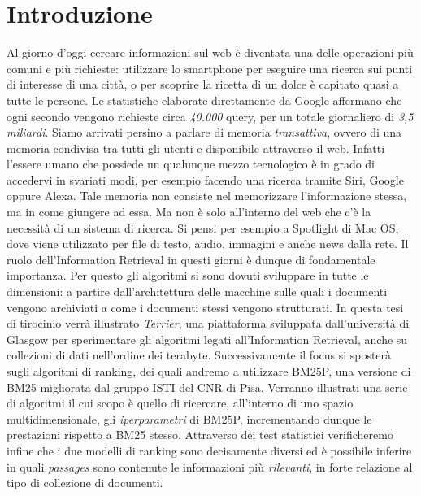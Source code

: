 \chapter{Introduzione}
Al giorno d'oggi cercare informazioni sul web è diventata una delle operazioni più comuni e più richieste:
utilizzare lo smartphone per eseguire una ricerca sui punti di interesse di una città, o per scoprire la ricetta di un dolce è capitato quasi a tutte le persone.
Le statistiche elaborate direttamente da Google affermano che ogni secondo vengono richieste circa \textit{40.000} query, per un totale
giornaliero di \textit{3,5 miliardi}.
Siamo arrivati persino a parlare di memoria \textit{transattiva}, ovvero di una memoria condivisa tra tutti gli utenti e disponibile attraverso il web.
Infatti l'essere umano che possiede un qualunque mezzo tecnologico è in grado di accedervi in svariati modi, per esempio facendo una ricerca tramite Siri, Google oppure Alexa.
Tale memoria non consiste nel memorizzare l'informazione stessa, ma in come giungere ad essa.
Ma non è solo all'interno del web che c'è la necessità di un sistema di ricerca. Si pensi per esempio a Spotlight di Mac OS, dove
viene utilizzato  per file di testo, audio, immagini e anche news dalla rete.
Il ruolo dell'Information Retrieval in questi giorni è dunque di fondamentale importanza.
Per questo gli algoritmi si sono dovuti sviluppare in tutte le dimensioni: a partire dall'architettura delle macchine sulle quali i documenti vengono archiviati a come i documenti stessi vengono strutturati. In questa tesi di tirocinio verrà illustrato \textit{Terrier}, una piattaforma sviluppata dall'università di Glasgow
per sperimentare gli algoritmi legati all'Information Retrieval, anche su collezioni di dati nell'ordine dei terabyte.  Successivamente il focus si sposterà
sugli algoritmi di ranking, dei quali andremo a utilizzare BM25P, una versione di BM25 migliorata dal gruppo ISTI del CNR di Pisa.
Verranno illustrati una serie di algoritmi il cui scopo è quello di ricercare, all'interno di uno spazio multidimensionale,
gli \textit{iperparametri} di BM25P, incrementando dunque le prestazioni rispetto a BM25 stesso.
Attraverso dei test statistici verificheremo infine che i due modelli di ranking sono decisamente diversi ed è possibile
inferire in quali \textit{passages} sono contenute le informazioni più \textit{rilevanti}, in forte relazione al tipo di collezione di documenti.

